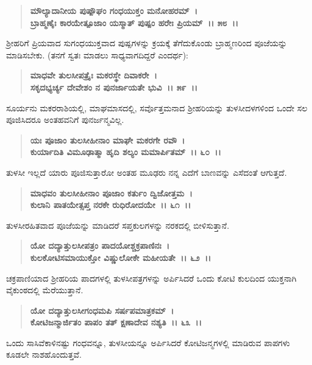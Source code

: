 \begin{verse}
\textbf{ಮೌಲ್ಯಾದಾನೀಯ ಪುಷ್ಪೌಘಂ ಗಂಧಯುಕ್ತಂ ಮನೋಹರಮ್~।}\\\textbf{ಬ್ರಾಹ್ಮಣೈಃ ಕಾರಯೇತ್ಪೂಜಾಂ ಯಸ್ಮಾತ್ ಪುಷ್ಪಂ ಹರೇಃ ಪ್ರಿಯಮ್~।। ೫೮~।।}
\end{verse}

ಶ‍್ರೀಹರಿಗೆ ಪ್ರಿಯವಾದ ಸುಗಂಧಯುಕ್ತವಾದ ಪುಷ್ಪಗಳನ್ನು ಕ್ರಯಕ್ಕೆ ತೆಗೆದುಕೊಂಡು ಬ್ರಾಹ್ಮಣರಿಂದ ಪೂಜೆಯನ್ನು ಮಾಡಿಸಬೇಕು. (ತನಗೆ ಸ್ವತಃ ಮಾಡಲು ಸಾಧ್ಯವಾಗದಿದ್ದರೆ ಎಂದರ್ಥ):

\begin{verse}
\textbf{ಮಾಧವೇ ತುಲಸೀಪತ್ರೈಃ ಮಕರಸ್ಥೇ ದಿವಾಕರೇ~।}\\\textbf{ಸಕೃದಭ್ಯರ್ಚ್ಯ ದೇವೇಶಂ ನ ಪುನರ್ಜಾಯತೇ ಭುವಿ~।। ೫೯~।।}
\end{verse}

ಸೂರ್ಯನು ಮಕರರಾಶಿಯಲ್ಲಿ, ಮಾಘಮಾಸದಲ್ಲಿ, ಸರ್ವೊತ್ತಮನಾದ ಶ‍್ರೀಹರಿಯನ್ನು ತುಳಸೀದಳಗಳಿಂದ ಒಂದೇ ಸಲ ಪೂಜಿಸಿದರೂ ಅಂತಹವನಿಗೆ ಪುನರ್ಜನ್ಮವಿಲ್ಲ.

\begin{verse}
\textbf{ಯಃ ಪೂಜಾಂ ತುಲಸೀಹೀನಾಂ ಮಾಘೇ ಮಕರಗೇ ರವೌ~।}\\\textbf{ಕುರ್ಯಾದಿತಿ ವಿಮೂಢಾತ್ಮಾ ಹೃದಿ ಶಲ್ಯಂ ಮಮಾರ್ಪಿತಮ್~।। ೬೦~।।}
\end{verse}

ತುಳಸೀ ಇಲ್ಲದೆ ಯಾರು ಪೂಜಿಸುತ್ತಾರೋ ಅಂತಹ ಮೂಢರು ನನ್ನ ಎದೆಗೆ ಬಾಣವನ್ನು ಎಸೆದಂತೆ ಆಗುತ್ತದೆ.

\begin{verse}
\textbf{ಮಾಧವಂ ತುಲಸೀಹೀನಾಂ ಪೂಜಾಂ ಕರ್ತುಂ ದ್ವಿಜೋತ್ತಮ~।}\\\textbf{ಕುಲಾನಿ ಪಾತಯೇತ್ಸಪ್ತ ನರಕೇ ರುಧಿರೋದಯೇ~।। ೬೧~।।}
\end{verse}

ತುಳಸೀರಹಿತವಾದ ಪೂಜೆಯನ್ನು ಮಾಡಿದರೆ ಸಪ್ತಕುಲಗಳನ್ನು ನರಕದಲ್ಲಿ ಬೀಳಿಸುತ್ತಾನೆ.

\begin{verse}
\textbf{ಯೋ ದದ್ಯಾತ್ತುಲಸೀಪತ್ರಂ ಪಾದಯೋಶ್ಚಕ್ರಪಾಣಿನಃ~।}\\\textbf{ಕುಲಕೋಟಿಸಮಾಯುಕ್ತೋ ವಿಷ್ಣುಲೋಕೇ ಮಹೀಯತೇ~।। ೬೨~।। }
\end{verse}

ಚಕ್ರಪಾಣಿಯಾದ ಶ‍್ರೀಹರಿಯ ಪಾದಗಳಲ್ಲಿ ತುಳಸೀಪತ್ರಗಳನ್ನು ಅರ್ಪಿಸಿದರೆ ಒಂದು ಕೋಟಿ ಕುಲದಿಂದ ಯುಕ್ತನಾಗಿ ವೈಕುಂಠದಲ್ಲಿ ಮೆರೆಯುತ್ತಾನೆ.

\begin{verse}
\textbf{ಯೋ ದದ್ಯಾತ್ತುಲಸೀಗಂಧಮಪಿ ಸರ್ಷಪಮಾತ್ರಕಮ್~।}\\\textbf{ಕೋಟಿಜನ್ಮಾರ್ಜಿತಂ ಪಾಪಂ ತತ್ ಕ್ಷಣಾದೇವ ನಶ್ಯತಿ~।। ೬೩~।।}
\end{verse}

ಒಂದು ಸಾಸಿವೆಕಾಳಿನಷ್ಟು ಗಂಧವನ್ನೂ, ತುಳಸೀಯನ್ನೂ ಅರ್ಪಿಸಿದರೆ ಕೋಟಿಜನ್ಮಗಳಲ್ಲಿ ಮಾಡಿರುವ ಪಾಪಗಳು ಕೂಡಲೇ ನಾಶಹೊಂದುತ್ತವೆ.

